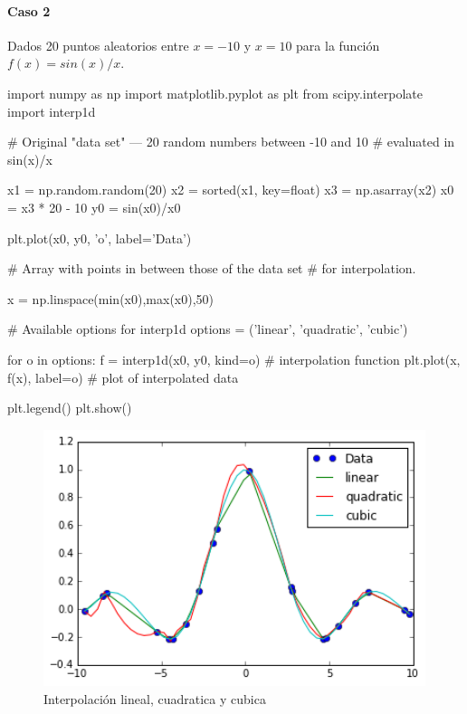 \documentclass[12pt,spanish]{article}
\begin{document}
\newpage

\paragraph{Caso 2}

Dados 20 puntos aleatorios entre $x=-10$ y $x=10$ para la función $f(x) = sin(x)/x$.

\begin{center}
\begin{boxedverbatim}

import numpy as np
import matplotlib.pyplot as plt
from scipy.interpolate import interp1d

# Original "data set" --- 20 random numbers between -10 and 10
# evaluated in sin(x)/x

x1 = np.random.random(20)
x2 = sorted(x1, key=float)
x3 = np.asarray(x2)
x0 = x3 * 20 - 10
y0 = sin(x0)/x0

plt.plot(x0, y0, 'o', label='Data')

# Array with points in between those of the data set
# for interpolation.

x = np.linspace(min(x0),max(x0),50)

# Available options for interp1d
options = ('linear', 'quadratic', 'cubic')

for o in options:
    f = interp1d(x0, y0, kind=o)  # interpolation function
    plt.plot(x, f(x), label=o)    # plot of interpolated data

plt.legend()
plt.show()
\end{boxedverbatim}
\end{center}

\begin{figure}[H]
    \centering
	\includegraphics[height=7.5cm]{caso2.png}
    \caption{Interpolación lineal, cuadratica y cubica}
\end{figure}
\end{document}
